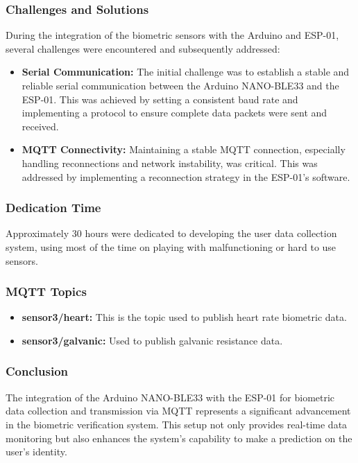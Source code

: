 \subsubsection{Challenges and Solutions}
During the integration of the biometric sensors with the Arduino and ESP-01, several challenges were encountered and subsequently addressed:
\begin{itemize}
\item \textbf{Serial Communication:} The initial challenge was to establish a stable and reliable serial communication between the Arduino NANO-BLE33 and the ESP-01. This was achieved by setting a consistent baud rate and implementing a protocol to ensure complete data packets were sent and received.
\item \textbf{MQTT Connectivity:} Maintaining a stable MQTT connection, especially handling reconnections and network instability, was critical. This was addressed by implementing a reconnection strategy in the ESP-01’s software.
\end{itemize}

\subsubsection{Dedication Time}
Approximately 30 hours were dedicated to developing the user data collection system, using most of the time on playing with malfunctioning or hard to use sensors.

\subsubsection{MQTT Topics}
\begin{itemize}
    \item \textbf{sensor3/heart:} This is the topic used to publish heart rate biometric data.
    \item \textbf{sensor3/galvanic:} Used to publish galvanic resistance data.
\end{itemize}

\subsubsection{Conclusion}
The integration of the Arduino NANO-BLE33 with the ESP-01 for biometric data collection and transmission via MQTT represents a significant advancement in the biometric verification system. This setup not only provides real-time data monitoring but also enhances the system's capability to make a prediction on the user's identity.
